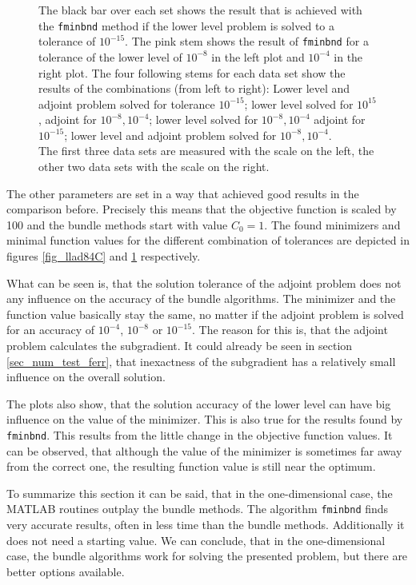 \begin{figure}[ht]
{	The black bar over each set shows the result that is achieved with the \textup{\texttt{fminbnd}} method if the lower level problem is solved to a tolerance of \(10^{-15}\). The pink stem shows the result of \textup{\texttt{fminbnd}} for a tolerance of the lower level of \(10^{-8}\) in the left plot and \(10^{-4}\) in the right plot. The four following stems for each data set show the results of the combinations (from left to right): Lower level and adjoint problem solved for tolerance \(10^{-15}\); lower level solved for \(10^{15}\), adjoint for \(10^{-8}, 10^{-4}\); lower level solved for \(10^{-8},10^{-4}\) adjoint for \(10^{-15}\); lower level and adjoint problem solved for \(10^{-8},10^{-4}\).\\
	The first three data sets are measured with the scale on the left, the other two data sets with the scale on the right.}%
	\label{fig_llad84f}%
\end{figure}

The other parameters are set in a way that achieved good results in the comparison before.
Precisely this means that the objective function is scaled by 100 and the bundle methods start with value \(C_0 = 1\). 
The found minimizers and minimal function values for the different combination of tolerances are depicted in figures \ref{fig_llad84C} and \ref{fig_llad84f} respectively.

What can be seen is, that the solution tolerance of the adjoint problem does not any influence on the accuracy of the bundle algorithms. The minimizer and the function value basically stay the same, no matter if the adjoint problem is solved for an accuracy of \(10^{-4}\), \(10^{-8}\) or \(10^{-15}\).
The reason for this is, that the adjoint problem calculates the subgradient. It could already be seen in section \ref{sec_num_test_ferr}, that inexactness of the subgradient has a relatively small influence on the overall solution.

The plots also show, that the solution accuracy of the lower level can have big influence on the value of the minimizer. This is also true for the results found by \texttt{fminbnd}.
This results from the little change in the objective function values. It can be observed, that although the value of the minimizer is sometimes far away from the correct one, the resulting function value is still near the optimum.

To summarize this section it can be said, that in the one-dimensional case, the MATLAB routines outplay the bundle methods. The algorithm \texttt{fminbnd} finds very accurate results, often in less time than the bundle methods. Additionally it does not need a starting value.
We can conclude, that in the one-dimensional case, the bundle algorithms work for solving the presented problem, but there are better options available.

